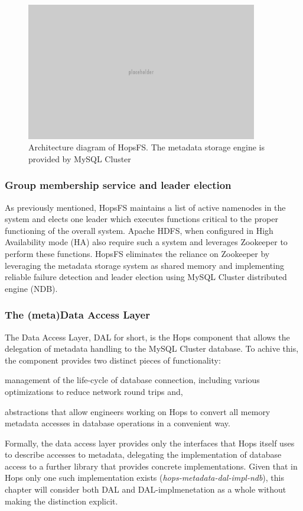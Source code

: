 \begin{figure}[h]
\caption{Architecture diagram of HopsFS. The metadata storage engine is provided by MySQL Cluster}
\label{fig:hopsfs-architecture}
\centering
\includegraphics[width=0.9\textwidth]{images/placeholder.png}
\end{figure}

\subsubsection{Group membership service and leader election}
\label{sec:leader-election}
As previously mentioned, HopsFS maintains a list of active namenodes in the system and elects one leader which executes functions critical to the proper functioning of the overall system.
Apache HDFS, when configured in High Availability mode (HA) also require such a system and leverages Zookeeper to perform these functions.
HopsFS eliminates the reliance on Zookeeper by leveraging the metadata storage system as shared memory and implementing reliable failure detection and leader election \cite{DBLP:conf/dais/NiaziIBD15} using MySQL Cluster distributed engine (NDB).
\cite{DBLP:journals/jacm/ChandraHT96}

\subsubsection{The (meta)Data Access Layer}
\label{sec:dal}
The Data Access Layer, DAL for short, is the Hops component that allows the delegation of metadata handling to the MySQL Cluster database.
To achive this, the component provides two distinct pieces of functionality:
\begin{inparaenum}[i)]
    \item management of the life-cycle of database connection, including various optimizations to reduce network round trips and,
    \item abstractions that allow engineers working on Hops to convert all memory metadata accesses in database operations in a convenient way.
\end{inparaenum}
Formally, the data access layer provides only the interfaces that Hops itself uses to describe accesses to metadata, delegating the implementation of database access to a further library that provides concrete implementations.
Given that in Hops only one such implementation exists (\textit{hops-metadata-dal-impl-ndb}), this chapter will consider both DAL and DAL-implmenetation as a whole without making the distinction explicit.

